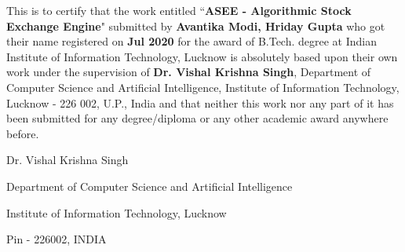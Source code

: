 This is to certify that the work entitled ``\textbf{ASEE - Algorithmic Stock Exchange Engine}" submitted by \textbf{Avantika Modi, Hriday Gupta} who got their name registered on \textbf{\;\;\; Jul 2020} for the award of B.Tech. degree at Indian Institute of Information Technology, Lucknow is absolutely based upon their own work under the supervision of \textbf{Dr. Vishal Krishna Singh}, Department of Computer Science and Artificial Intelligence, Institute of Information Technology, Lucknow - 226 002, U.P., India and that neither this work nor any part of it has been submitted for any degree/diploma or any other academic award anywhere before.  

\vspace{4cm}

\begin{center}
    Dr. Vishal Krishna Singh

    Department of Computer Science and Artificial Intelligence 

    Institute of Information Technology, Lucknow 

    Pin - 226002, INDIA 
\end{center}
